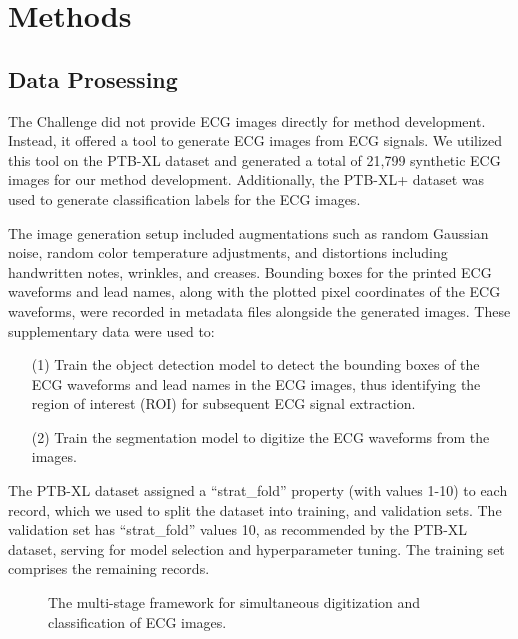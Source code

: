 \section{Methods}
\label{sec:methods}


\subsection{Data Prosessing}
\label{subsec:data_processing}


The Challenge did not provide ECG images directly for method development. Instead, it offered a tool \cite{Shivashankara_2024_ECG} to generate ECG images from ECG signals. We utilized this tool on the PTB-XL dataset \cite{wagner2020ptb_xl} and generated a total of 21,799 synthetic ECG images for our method development. Additionally, the PTB-XL+ dataset \cite{Strodthoff_2023} was used to generate classification labels for the ECG images.

The image generation setup included augmentations such as random Gaussian noise, random color temperature adjustments, and distortions including handwritten notes, wrinkles, and creases. Bounding boxes for the printed ECG waveforms and lead names, along with the plotted pixel coordinates of the ECG waveforms, were recorded in metadata files alongside the generated images. These supplementary data were used to:
\begin{itemize}
\item[(1)] Train the object detection model to detect the bounding boxes of the ECG waveforms and lead names in the ECG images, thus identifying the region of interest (ROI) for subsequent ECG signal extraction.
\item[(2)] Train the segmentation model to digitize the ECG waveforms from the images.
\end{itemize}

The PTB-XL dataset assigned a ``strat\_fold'' property (with values 1-10) to each record, which we used to split the dataset into training, and validation sets. The validation set has ``strat\_fold'' values 10, as recommended by the PTB-XL dataset, serving for model selection and hyperparameter tuning. The training set comprises the remaining records.

\begin{figure}[!ht]
\centering

\caption{The multi-stage framework for simultaneous digitization and classification of ECG images.}
\label{fig:multi-stage-framework}
\end{figure}


